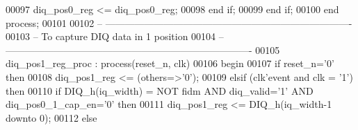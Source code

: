 \begin{DoxyCode}
00097                 \textcolor{vhdlchar}{diq_pos0_reg}    \textcolor{vhdlchar}{<=} \textcolor{vhdlchar}{diq_pos0_reg};
00098             \textcolor{keywordflow}{end} \textcolor{keywordflow}{if}; 
00099         \textcolor{keywordflow}{end} \textcolor{keywordflow}{if};
00100     \textcolor{keywordflow}{end} \textcolor{keywordflow}{process};
00101 
00102 \textcolor{keyword}{-- ----------------------------------------------------------------------------}
00103 \textcolor{keyword}{-- To capture DIQ data in 1 position}
00104 \textcolor{keyword}{-- ----------------------------------------------------------------------------}
00105  diq\_pos1\_reg\_proc : \textcolor{keywordflow}{process}(reset_n, clk)
00106 \textcolor{vhdlkeyword}{    begin}
00107       \textcolor{keywordflow}{if} \textcolor{vhdlchar}{reset_n}\textcolor{vhdlchar}{=}\textcolor{vhdlchar}{'}\textcolor{vhdllogic}{}\textcolor{vhdllogic}{0}\textcolor{vhdlchar}{'} \textcolor{keywordflow}{then}
00108          \textcolor{vhdlchar}{diq_pos1_reg} \textcolor{vhdlchar}{<=} \textcolor{vhdlchar}{(}\textcolor{keywordflow}{others}\textcolor{vhdlchar}{=}\textcolor{vhdlchar}{>}\textcolor{vhdlchar}{'}\textcolor{vhdllogic}{}\textcolor{vhdllogic}{0}\textcolor{vhdlchar}{'}\textcolor{vhdlchar}{)};
00109       \textcolor{keywordflow}{elsif} \textcolor{vhdlchar}{(}\textcolor{vhdlchar}{clk}\textcolor{vhdlchar}{'}\textcolor{vhdlkeyword}{event} \textcolor{keywordflow}{and} \textcolor{vhdlchar}{clk} \textcolor{vhdlchar}{=} \textcolor{vhdlchar}{'}\textcolor{vhdllogic}{}\textcolor{vhdllogic}{1}\textcolor{vhdlchar}{'}\textcolor{vhdlchar}{)} \textcolor{keywordflow}{then}
00110             \textcolor{keywordflow}{if} \textcolor{vhdlchar}{DIQ_h}\textcolor{vhdlchar}{(}\textcolor{vhdlchar}{iq_width}\textcolor{vhdlchar}{)} \textcolor{vhdlchar}{=} \textcolor{keywordflow}{NOT} \textcolor{vhdlchar}{fidm} \textcolor{keywordflow}{AND} \textcolor{vhdlchar}{diq_valid}\textcolor{vhdlchar}{=}\textcolor{vhdlchar}{'}\textcolor{vhdllogic}{}\textcolor{vhdllogic}{1}\textcolor{vhdlchar}{'} \textcolor{keywordflow}{AND} \textcolor{vhdlchar}{
      diq_pos0_1_cap_en}\textcolor{vhdlchar}{=}\textcolor{vhdlchar}{'}\textcolor{vhdllogic}{}\textcolor{vhdllogic}{0}\textcolor{vhdlchar}{'} \textcolor{keywordflow}{then} 
00111             \textcolor{vhdlchar}{diq_pos1_reg} \textcolor{vhdlchar}{<=} \textcolor{vhdlchar}{DIQ_h}\textcolor{vhdlchar}{(}\textcolor{vhdlchar}{iq_width}\textcolor{vhdlchar}{-}\textcolor{vhdllogic}{}\textcolor{vhdllogic}{1} \textcolor{keywordflow}{downto} \textcolor{vhdllogic}{}\textcolor{vhdllogic}{0}\textcolor{vhdlchar}{)};
00112             \textcolor{keywordflow}{else} 

\end{DoxyCode}
